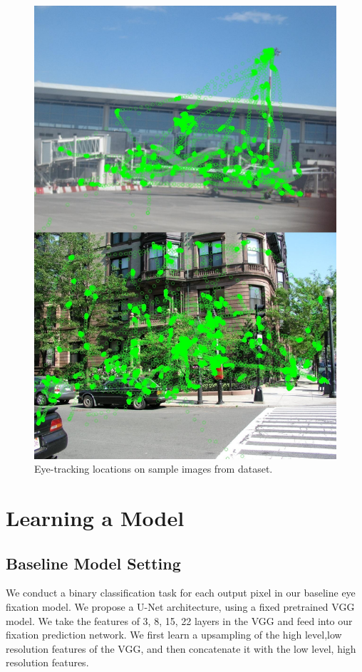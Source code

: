 \documentclass[10pt,twocolumn,letterpaper]{article}
\begin{document}
\begin{figure}
	\begin{center}
		\includegraphics[width=0.5\columnwidth]{figures/movements.jpg}
	\end{center}
	\caption{Eye-tracking locations on sample images from dataset.}
	\label{fig:dataset}
\end{figure}

\section{Learning a Model}
\subsection{Baseline Model Setting}
We conduct a binary classification task for each output pixel in our baseline eye fixation model. We propose a U-Net architecture, using a fixed pretrained VGG model. We take the features of 3, 8, 15, 22 layers in the VGG and feed into our fixation prediction network. We first learn a upsampling of the high level,low resolution features of the VGG, and then concatenate it with the low level, high resolution features.
\end{document}
